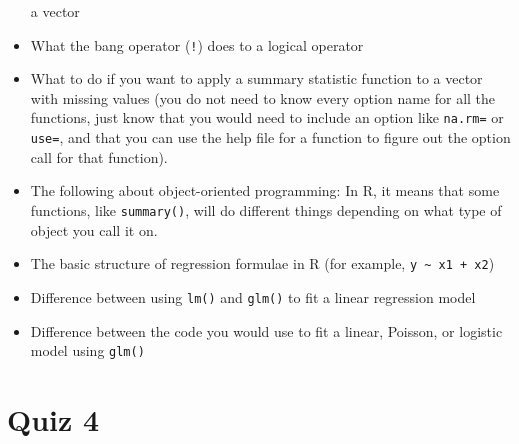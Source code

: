 \documentclass[]{book}
\theoremstyle{definition}
\theoremstyle{definition}
\theoremstyle{definition}
\theoremstyle{remark}
\begin{document}
\begin{itemize}
  a vector
\item
  What the bang operator (\texttt{!}) does to a logical operator
\item
  What to do if you want to apply a summary statistic function to a
  vector with missing values (you do not need to know every option name
  for all the functions, just know that you would need to include an
  option like \texttt{na.rm=} or \texttt{use=}, and that you can use the
  help file for a function to figure out the option call for that
  function).
\item
  The following about object-oriented programming: In R, it means that
  some functions, like \texttt{summary()}, will do different things
  depending on what type of object you call it on.
\item
  The basic structure of regression formulae in R (for example,
  \texttt{y\ \textasciitilde{}\ x1\ +\ x2})
\item
  Difference between using \texttt{lm()} and \texttt{glm()} to fit a
  linear regression model
\item
  Difference between the code you would use to fit a linear, Poisson, or
  logistic model using \texttt{glm()}
\end{itemize}

\section{Quiz 4}\label{quiz-4}
\end{document}
